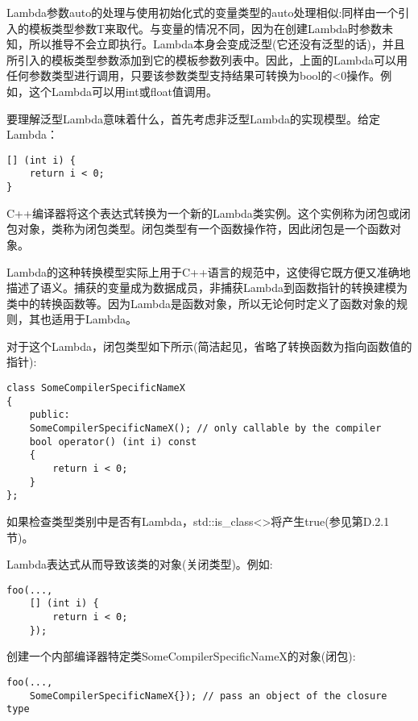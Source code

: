 Lambda参数auto的处理与使用初始化式的变量类型的auto处理相似:同样由一个引入的模板类型参数T来取代。与变量的情况不同，因为在创建Lambda时参数未知，所以推导不会立即执行。Lambda本身会变成泛型(它还没有泛型的话)，并且所引入的模板类型参数添加到它的模板参数列表中。因此，上面的Lambda可以用任何参数类型进行调用，只要该参数类型支持结果可转换为bool的<0操作。例如，这个Lambda可以用int或float值调用。

要理解泛型Lambda意味着什么，首先考虑非泛型Lambda的实现模型。给定Lambda：

\begin{lstlisting}[style=styleCXX]
[] (int i) {
	return i < 0;
}
\end{lstlisting}

C++编译器将这个表达式转换为一个新的Lambda类实例。这个实例称为闭包或闭包对象，类称为闭包类型。闭包类型有一个函数操作符，因此闭包是一个函数对象。

\begin{tcolorbox}[colback=webgreen!5!white,colframe=webgreen!75!black]
\hspace*{0.75cm}Lambda的这种转换模型实际上用于C++语言的规范中，这使得它既方便又准确地描述了语义。捕获的变量成为数据成员，非捕获Lambda到函数指针的转换建模为类中的转换函数等。因为Lambda是函数对象，所以无论何时定义了函数对象的规则，其也适用于Lambda。
\end{tcolorbox}

对于这个Lambda，闭包类型如下所示(简洁起见，省略了转换函数为指向函数值的指针):

\begin{lstlisting}[style=styleCXX]
class SomeCompilerSpecificNameX
{
	public:
	SomeCompilerSpecificNameX(); // only callable by the compiler
	bool operator() (int i) const
	{
		return i < 0;
	}
};
\end{lstlisting}

如果检查类型类别中是否有Lambda，std::is\_class<>将产生true(参见第D.2.1节)。

Lambda表达式从而导致该类的对象(关闭类型)。例如:

\begin{lstlisting}[style=styleCXX]
foo(...,
	[] (int i) {
		return i < 0;
	});
\end{lstlisting}

创建一个内部编译器特定类SomeCompilerSpecificNameX的对象(闭包):

\begin{lstlisting}[style=styleCXX]
foo(...,
	SomeCompilerSpecificNameX{}); // pass an object of the closure type
\end{lstlisting}

